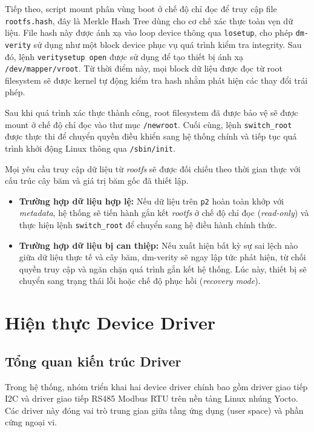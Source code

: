 Tiếp theo, script mount phân vùng boot ở chế độ chỉ đọc để truy cập file \texttt{rootfs.hash}, đây là Merkle Hash Tree dùng cho cơ chế xác thực toàn vẹn dữ liệu. File hash này được ánh xạ vào loop device thông qua \texttt{losetup}, cho phép \texttt{dm-verity} sử dụng như một block device phục vụ quá trình kiểm tra integrity. Sau đó, lệnh \texttt{veritysetup open} được sử dụng để tạo thiết bị ánh xạ \texttt{/dev/mapper/vroot}. Từ thời điểm này, mọi block dữ liệu được đọc từ root filesystem sẽ được kernel tự động kiểm tra hash nhằm phát hiện các thay đổi trái phép.

Sau khi quá trình xác thực thành công, root filesystem đã được bảo vệ sẽ được mount ở chế độ chỉ đọc vào thư mục \texttt{/newroot}. Cuối cùng, lệnh \texttt{switch\_root} được thực thi để chuyển quyền điều khiển sang hệ thống chính và tiếp tục quá trình khởi động Linux thông qua \texttt{/sbin/init}.

Mọi yêu cầu truy cập dữ liệu từ \textit{rootfs} sẽ được đối chiếu theo thời gian thực với cấu trúc cây băm và giá trị băm gốc đã thiết lập.

\begin{itemize}
    \item \textbf{Trường hợp dữ liệu hợp lệ:} Nếu dữ liệu trên \texttt{p2} hoàn toàn khớp với \textit{metadata}, hệ thống sẽ tiến hành gắn kết \textit{rootfs} ở chế độ chỉ đọc (\textit{read-only}) và thực hiện lệnh \texttt{switch\_root} để chuyển sang hệ điều hành chính thức.
    
    \item \textbf{Trường hợp dữ liệu bị can thiệp:} Nếu xuất hiện bất kỳ sự sai lệch nào giữa dữ liệu thực tế và cây băm, dm-verity sẽ ngay lập tức phát hiện, từ chối quyền truy cập và ngăn chặn quá trình gắn kết hệ thống. Lúc này, thiết bị sẽ chuyển sang trạng thái lỗi hoặc chế độ phục hồi (\textit{recovery mode}).
\end{itemize}

\section{Hiện thực Device Driver}

\subsection{Tổng quan kiến trúc Driver}
Trong hệ thống, nhóm triển khai hai device driver chính bao gồm driver giao tiếp I2C và driver giao tiếp RS485 Modbus RTU trên nền tảng Linux nhúng Yocto. Các driver này đóng vai trò trung gian giữa tầng ứng dụng (user space) và phần cứng ngoại vi.

